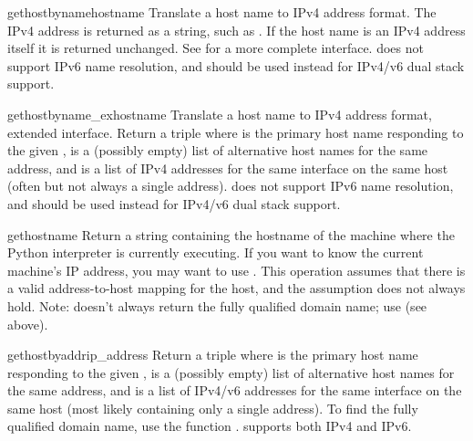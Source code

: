 \begin{funcdesc}{gethostbyname}{hostname}
Translate a host name to IPv4 address format.  The IPv4 address is
returned as a string, such as  .  If the host name
is an IPv4 address itself it is returned unchanged.  See
 for a more complete interface.
 does not support IPv6 name resolution, and
 should be used instead for IPv4/v6 dual stack support.
\end{funcdesc}

\begin{funcdesc}{gethostbyname_ex}{hostname}
Translate a host name to IPv4 address format, extended interface.
Return a triple  where
 is the primary host name responding to the given
,  is a (possibly empty) list of
alternative host names for the same address, and  is
a list of IPv4 addresses for the same interface on the same
host (often but not always a single address).
 does not support IPv6 name resolution, and
 should be used instead for IPv4/v6 dual stack support.
\end{funcdesc}

\begin{funcdesc}{gethostname}{}
Return a string containing the hostname of the machine where 
the Python interpreter is currently executing.
If you want to know the current machine's IP address, you may want to use
.
This operation assumes that there is a valid address-to-host mapping for
the host, and the assumption does not always hold.
Note:  doesn't always return the fully qualified
domain name; use 
(see above).
\end{funcdesc}

\begin{funcdesc}{gethostbyaddr}{ip_address}
Return a triple  where  is the primary host name
responding to the given ,  is a
(possibly empty) list of alternative host names for the same address,
and  is a list of IPv4/v6 addresses for the same interface
on the same host (most likely containing only a single address).
To find the fully qualified domain name, use the function
.
 supports both IPv4 and IPv6.
\end{funcdesc}

